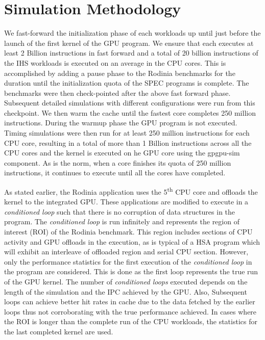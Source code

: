 \section{Simulation Methodology} \label{simulation-methodology}
We fast-forward the initialization phase of each workloads up until just before the launch of the first kernel of the GPU program. We ensure that each executes at least 2 Billion instructions in fast forward and a total of 20 billion instructions of the IHS workloads is executed on an average in the CPU cores. This is accomplished by adding a pause phase to the Rodinia benchmarks for the duration until the initialization quota of the SPEC programs is complete. The benchmarks were then check-pointed after the above fast forward phase. Subsequent detailed simulations with different configurations were run from this checkpoint.
We then warm the cache until the fastest core completes 250 million instructions. During the warmup phase the GPU program is not executed. Timing simulations were then run for at least 250 million instructions for each CPU core, resulting in a total of more than 1 Billion instructions across all the CPU cores and the kernel is executed on he GPU core using the gpgpu-sim component. As is the norm, when a core finishes its quota of 250 million instructions, it continues to execute until all the cores have completed.
\par As stated earlier, the Rodinia application uses the 5\textsuperscript{th} CPU core and offloads the kernel to the integrated GPU. These applications are modified to execute in a \textit{conditioned loop} such that there is no corruption of data structures in the program. The \textit{conditioned loop} is run infinitely and represents the region of interest (ROI) of the Rodinia benchmark. This region includes sections of CPU activity and GPU offloads in the execution, as is typical of a HSA program which will exhibit an interleave of offloaded region and serial CPU section. However, only the performance statistics for the first execution of the \textit{conditioned loop} in the program are considered. 
This is done as the first loop represents the true run of the GPU kernel. The number of \textit{conditioned loops} executed depends on the length of the simulation and the IPC achieved by the GPU. Also, Subsequent loops can achieve better hit rates in cache due to the data fetched by the earlier loops thus not corroborating with the true performance achieved.
In cases where the ROI is longer than the complete run of the CPU workloads, the statistics for the last completed kernel are used. 

